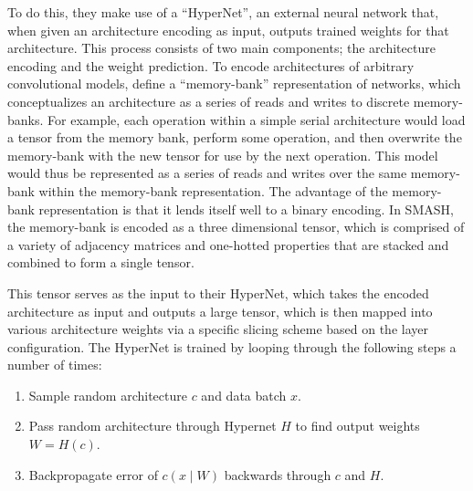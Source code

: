 To do this, they make use of a ``HyperNet'', an external neural network that, when given an architecture encoding as
input, outputs trained weights for that architecture. This process consists of two main components; the architecture
encoding and the weight prediction. To encode architectures of arbitrary convolutional models, \citeauthor{brock2017} define a
``memory-bank'' representation of networks, which conceptualizes an architecture as a series of reads and writes to
discrete memory-banks. For example, each operation within a simple serial architecture would load a tensor from the memory
bank, perform some operation, and then overwrite the memory-bank with the new tensor for use by the next operation. This
model would thus be represented as a series of reads and writes over the same memory-bank within the memory-bank representation.
The advantage of the memory-bank representation is that it lends itself well to a binary encoding. In SMASH, the memory-bank
is encoded as a three dimensional tensor, which is comprised of a variety of adjacency matrices and one-hotted properties
that are stacked and combined to form a single tensor.

This tensor serves as the input to their HyperNet, which takes the encoded architecture as input and outputs a large tensor,
which is then mapped into various architecture weights via a specific slicing scheme based on the layer configuration. The
HyperNet is trained by looping through the following steps a number of times:

\begin{enumerate}[itemsep=-2mm]
    \item Sample random architecture $c$ and data batch $x$.
    \item Pass random architecture through Hypernet $H$ to find output weights $W = H(c)$.
    \item Backpropagate error of $c(x\;|\;W)$ backwards through $c$ and $H$.
\end{enumerate}

